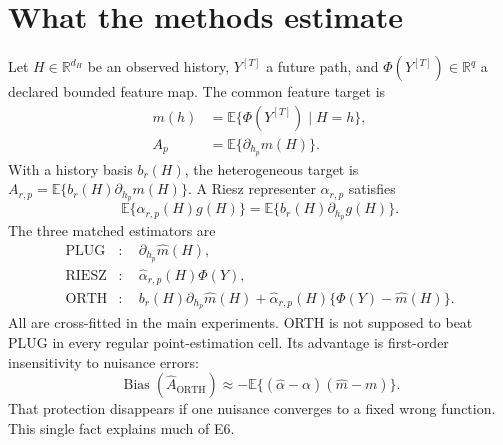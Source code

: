 \documentclass[10.5pt]{article}
\newcommand{\R}{\mathbb{R}}
\newcommand{\E}{\mathbb{E}}
\newcommand{\orth}{\mathrm{ORTH}}
\newcommand{\plug}{\mathrm{PLUG}}
\newcommand{\riesz}{\mathrm{RIESZ}}
\begin{document}
\section{What the methods estimate}

Let $H\in\R^{d_H}$ be an observed history, $Y^{[T]}$ a future path, and $\Phi(Y^{[T]})\in\R^q$ a declared bounded feature map.  The common feature target is
\begin{align}
m(h) &= \E\{\Phi(Y^{[T]})\mid H=h\},\\
A_p &= \E\{\partial_{h_p}m(H)\}.
\end{align}
With a history basis $b_r(H)$, the heterogeneous target is $A_{r,p}=\E\{b_r(H)\partial_{h_p}m(H)\}$.  A Riesz representer $\alpha_{r,p}$ satisfies
\begin{equation}
\E\{\alpha_{r,p}(H)g(H)\}=\E\{b_r(H)\partial_{h_p}g(H)\}.
\end{equation}
The three matched estimators are
\begin{align}
\plug &: \quad \partial_{h_p}\widehat m(H),\\
\riesz &: \quad \widehat\alpha_{r,p}(H)\Phi(Y),\\
\orth &: \quad b_r(H)\partial_{h_p}\widehat m(H)+\widehat\alpha_{r,p}(H)\{\Phi(Y)-\widehat m(H)\}.
\end{align}
All are cross-fitted in the main experiments.  ORTH is not supposed to beat PLUG in every regular point-estimation cell.  Its advantage is first-order insensitivity to nuisance errors:
\begin{equation}
\operatorname{Bias}(\widehat A_{\orth})\approx-\E\{(\widehat\alpha-\alpha)(\widehat m-m)\}.
\end{equation}
That protection disappears if one nuisance converges to a fixed wrong function.  This single fact explains much of E6.
\end{document}
